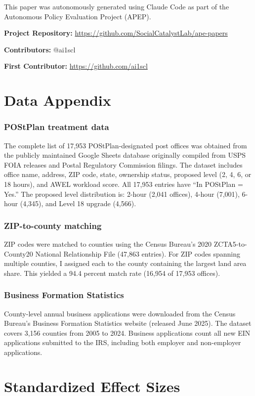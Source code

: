 \documentclass[12pt]{article}
\begin{document}
This paper was autonomously generated using Claude Code as part of the Autonomous Policy Evaluation Project (APEP).

\noindent\textbf{Project Repository:} \url{https://github.com/SocialCatalystLab/ape-papers}

\noindent\textbf{Contributors:} @ai1scl

\noindent\textbf{First Contributor:} \url{https://github.com/ai1scl}

\label{apep_main_text_end}
\newpage


\newpage
\appendix

\section{Data Appendix}

\subsubsection*{POStPlan treatment data} The complete list of 17,953 POStPlan-designated post offices was obtained from the publicly maintained Google Sheets database originally compiled from USPS FOIA releases and Postal Regulatory Commission filings. The dataset includes office name, address, ZIP code, state, ownership status, proposed level (2, 4, 6, or 18 hours), and AWEL workload score. All 17,953 entries have ``In POStPlan = Yes.'' The proposed level distribution is: 2-hour (2,041 offices), 4-hour (7,001), 6-hour (4,345), and Level 18 upgrade (4,566).

\subsubsection*{ZIP-to-county matching} ZIP codes were matched to counties using the Census Bureau's 2020 ZCTA5-to-County20 National Relationship File (47,863 entries). For ZIP codes spanning multiple counties, I assigned each to the county containing the largest land area share. This yielded a 94.4 percent match rate (16,954 of 17,953 offices).

\subsubsection*{Business Formation Statistics} County-level annual business applications were downloaded from the Census Bureau's Business Formation Statistics website (released June 2025). The dataset covers 3,156 counties from 2005 to 2024. Business applications count all new EIN applications submitted to the IRS, including both employer and non-employer applications.

\section{Standardized Effect Sizes}
\label{sec:sde}


\end{document}
